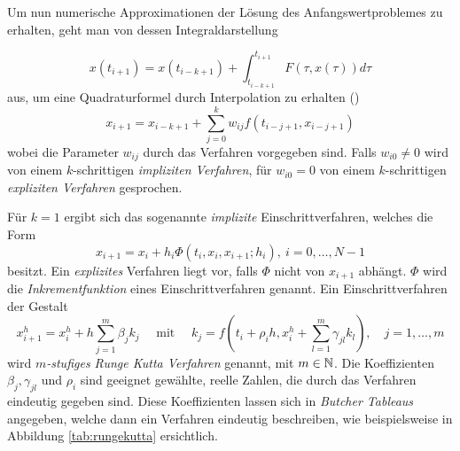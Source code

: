 Um nun numerische Approximationen der Lösung des Anfangswertproblemes zu erhalten, geht man von dessen Integraldarstellung 

\[
 x(t_{i+1}) = x(t_{i-k+1}) + \int_{t_{i-k+1}}^{t_{i+1}} F(\tau,x(\tau))d\tau
\]
aus, um eine Quadraturformel durch Interpolation zu erhalten (\cite[(1.55)]{hermann2004numerik})
\[
 x_{i+1} = x_{i-k+1} + \sum_{j=0}^k w_{ij} f(t_{i-j+1},x_{i-j+1})
\]
wobei die Parameter $w_{ij}$ durch das Verfahren vorgegeben sind. Falls $w_{i0}\neq 0$ wird von einem $k$-schrittigen \textit{impliziten Verfahren}, für $w_{i0} = 0$ von einem $k$-schrittigen \textit{expliziten Verfahren} gesprochen.

Für $k=1$ ergibt sich das sogenannte \textit{implizite} Einschrittverfahren, welches die Form
\[
 x_{i+1} = x_i + h_i \Phi (t_i,x_i,x_{i+1};h_i), ~ i=0,\ldots, N-1
\]
besitzt.
Ein \textit{explizites} Verfahren liegt vor, falls $\Phi$ nicht von $x_{i+1}$ abhängt. $\Phi$ wird die \textit{Inkrementfunktion} eines Einschrittverfahren genannt.
Ein Einschrittverfahren der Gestalt 
\[
 x_{i+1}^h = x_i^h + h\sum_{j=1}^m \beta_j k_j \quad \text{ mit } \quad k_j  = f(t_i+ \rho_ih, x_i^h + \sum_{l=1}^m \gamma_{jl} k_l ), \quad j=1,\ldots,m
\]
wird \textit{$m$-stufiges Runge Kutta Verfahren} genannt, mit $m\in \mathbb{N}$. Die Koeffizienten $\beta_j,\gamma_{jl}$ und $\rho_i$ sind geeignet gewählte, reelle Zahlen, die durch das Verfahren eindeutig gegeben sind. Diese Koeffizienten lassen sich in \textit{Butcher Tableaus} angegeben, welche dann ein Verfahren eindeutig beschreiben, wie beispielsweise in Abbildung \ref{tab:rungekutta} ersichtlich.

